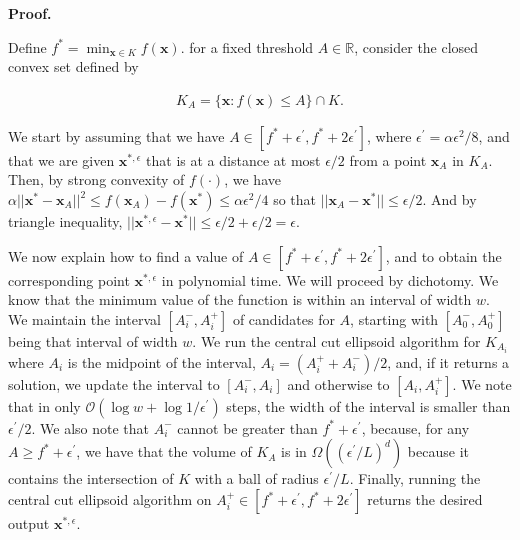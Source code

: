 


\par\medskip\noindent\textbf{Proof.}\par




Define $f^{*}=\min_{{\boldsymbol{x}}\in K}f({\boldsymbol{x}})$. for a fixed threshold $A\in\mathbb{R}$, consider the closed convex set defined by\par


\[\begin{gathered}
K_{A}=\{{\boldsymbol{x}}\colon f({\boldsymbol{x}})\leq A\}\cap K.
\end{gathered}\]


We start by assuming that we have $A\in[f^{*}+\epsilon^{\prime},f^{*}+2\epsilon^{\prime}]$, where $\epsilon^{\prime}=\alpha\epsilon^{2}/8$, and that we are given ${\boldsymbol{x}}^{*,\epsilon}$ that is at a distance at most $\epsilon/2$ from a point ${\boldsymbol{x}}_{A}$ in $K_{A}$. Then, by strong convexity of $f(\cdot)$, we have $\alpha||{\boldsymbol{x}}^{*}-{\boldsymbol{x}}_{A}||^{2}\leq f({\boldsymbol{x}}_{A})-f({\boldsymbol{x}}^{*})\leq\alpha\epsilon^{2}/4$ so that $||{\boldsymbol{x}}_{A}-{\boldsymbol{x}}^{*}||\leq\epsilon/2$. And by triangle inequality, $||{\boldsymbol{x}}^{*,\epsilon}-{\boldsymbol{x}}^{*}||\leq\epsilon/2+\epsilon/2=\epsilon$.\par




We now explain how to find a value of $A\in[f^{*}+\epsilon^{\prime},f^{*}+2\epsilon^{\prime}]$, and to obtain the corresponding point ${\boldsymbol{x}}^{*,\epsilon}$ in polynomial time. We will proceed by dichotomy. We know that the minimum value of the function is within an interval of width $w$. We maintain the interval $[A^{-}_{i},A^{+}_{i}]$ of candidates for $A$, starting with $[A_{0}^{-},A_{0}^{+}]$ being that interval of width $w$. We run the central cut ellipsoid algorithm for $K_{A_{i}}$ where $A_{i}$ is the midpoint of the interval, $A_{i}=(A_{i}^{+}+A_{i}^{-})/2$, and, if it returns a solution, we update the interval to $[A_{i}^{-},A_{i}]$ and otherwise to $[A_{i},A_{i}^{+}]$. We note that in only $\mathcal{O}(\log w+\log 1/\epsilon^{\prime})$
steps, the width of the interval is smaller than $\epsilon^{\prime}/2$. We also note that $A_{i}^{-}$ cannot be greater than $f^{*}+\epsilon^{\prime}$, because, for any $A\geq f^{*}+\epsilon^{\prime}$, we have that the volume of $K_{A}$ is in $\Omega((\epsilon^{\prime}/L)^{d})$ because it contains the intersection of $K$ with a ball of radius $\epsilon^{\prime}/L$. Finally, running the central cut ellipsoid algorithm on $A_{i}^{+}\in[f^{*}+\epsilon^{\prime},f^{*}+2\epsilon^{\prime}]$ returns the desired output ${\boldsymbol{x}}^{*,\epsilon}$.\par




